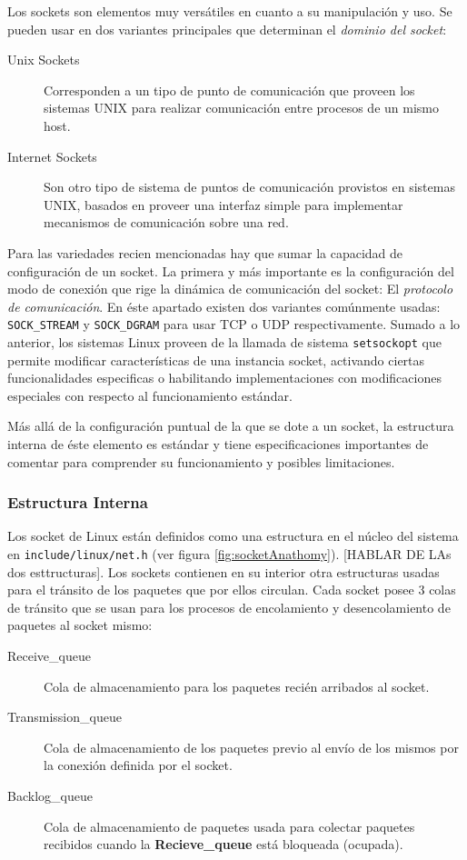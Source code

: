 Los sockets son elementos muy versátiles en cuanto a su manipulación y uso. Se pueden usar en dos variantes principales que determinan el \emph{dominio del socket}:
\begin{description}
\item[Unix Sockets] Corresponden a un tipo de punto de comunicación que proveen los sistemas UNIX para realizar comunicación entre procesos de un mismo host.
\item[Internet Sockets] Son otro tipo de sistema de puntos de comunicación provistos en sistemas UNIX, basados en proveer una interfaz simple para implementar mecanismos de comunicación sobre una red.
\end{description}

Para las variedades recien mencionadas hay que sumar la capacidad de configuración de un socket. La primera y más importante es la configuración del modo de conexión que rige la dinámica de comunicación del socket: El \emph{protocolo de comunicación}. En éste apartado existen dos variantes comúnmente usadas: \verb=SOCK_STREAM= y \verb=SOCK_DGRAM= para usar TCP o UDP respectivamente. Sumado a lo anterior, los sistemas Linux proveen de la llamada de sistema \verb=setsockopt= que permite modificar características de una instancia socket, activando ciertas funcionalidades especificas o habilitando implementaciones con modificaciones especiales con respecto al funcionamiento estándar.

Más allá de la configuración puntual de la que se dote a un socket, la estructura interna de éste elemento es estándar y tiene especificaciones importantes de comentar para comprender su funcionamiento y posibles limitaciones.

\subsubsection{Estructura Interna}
Los socket de Linux están definidos como una estructura en el núcleo del sistema en \verb=include/linux/net.h= (ver figura \ref{fig:socketAnathomy}). [HABLAR DE LAs dos esttructuras]. Los sockets contienen en su interior otra estructuras usadas para el tránsito de los paquetes que por ellos circulan. Cada socket posee 3 colas de tránsito que se usan para los procesos de encolamiento y desencolamiento de paquetes al socket mismo:
\begin{description}
\item[Receive\_queue] Cola de almacenamiento para los paquetes recién arribados al socket.
\item[Transmission\_queue] Cola de almacenamiento de los paquetes previo al envío de los mismos por la conexión definida por el socket.
\item[Backlog\_queue] Cola de almacenamiento de paquetes usada para colectar paquetes recibidos cuando la \textbf{Recieve\_queue} está bloqueada (ocupada).
\end{description}


